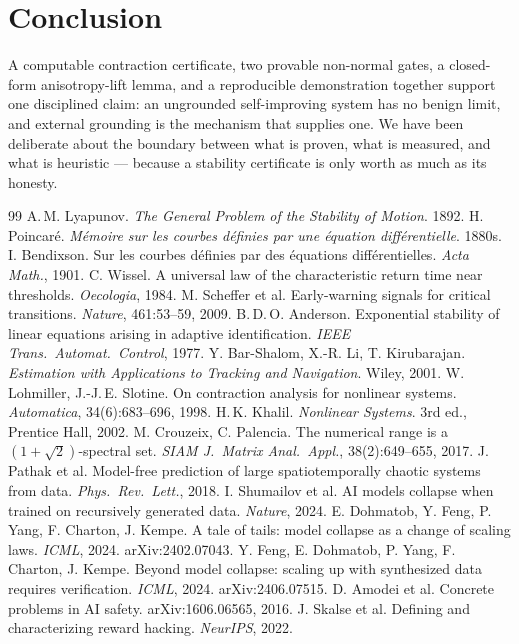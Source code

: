 \documentclass[11pt]{article}
\theoremstyle{definition}
\begin{document}
\section{Conclusion}
A computable contraction certificate, two provable non-normal gates, a closed-form
anisotropy-lift lemma, and a reproducible demonstration together support one disciplined
claim: an ungrounded self-improving system has no benign limit, and external grounding is
the mechanism that supplies one. We have been deliberate about the boundary between what is
proven, what is measured, and what is heuristic --- because a stability certificate is only
worth as much as its honesty.

\begin{thebibliography}{99}
 A.\,M. Lyapunov.
  \emph{The General Problem of the Stability of Motion}. 1892.
 H. Poincar\'e.
  \emph{M\'emoire sur les courbes d\'efinies par une \'equation diff\'erentielle}. 1880s.
 I. Bendixson.
  Sur les courbes d\'efinies par des \'equations diff\'erentielles. \emph{Acta Math.}, 1901.
 C. Wissel.
  A universal law of the characteristic return time near thresholds. \emph{Oecologia}, 1984.
 M. Scheffer et al.
  Early-warning signals for critical transitions. \emph{Nature}, 461:53--59, 2009.
 B.\,D.\,O. Anderson.
  Exponential stability of linear equations arising in adaptive identification.
  \emph{IEEE Trans.\ Automat.\ Control}, 1977.
 Y. Bar-Shalom, X.-R. Li, T. Kirubarajan.
  \emph{Estimation with Applications to Tracking and Navigation}. Wiley, 2001.
 W. Lohmiller, J.-J.\,E. Slotine.
  On contraction analysis for nonlinear systems. \emph{Automatica}, 34(6):683--696, 1998.
 H.\,K. Khalil.
  \emph{Nonlinear Systems}. 3rd ed., Prentice Hall, 2002.
 M. Crouzeix, C. Palencia.
  The numerical range is a $(1+\sqrt2)$-spectral set. \emph{SIAM J.\ Matrix Anal.\ Appl.},
  38(2):649--655, 2017.
 J. Pathak et al.
  Model-free prediction of large spatiotemporally chaotic systems from data.
  \emph{Phys.\ Rev.\ Lett.}, 2018.
 I. Shumailov et al.
  AI models collapse when trained on recursively generated data. \emph{Nature}, 2024.
 E. Dohmatob, Y. Feng, P. Yang, F. Charton, J. Kempe.
  A tale of tails: model collapse as a change of scaling laws. \emph{ICML}, 2024.
  arXiv:2402.07043.
 Y. Feng, E. Dohmatob, P. Yang, F. Charton, J. Kempe.
  Beyond model collapse: scaling up with synthesized data requires verification.
  \emph{ICML}, 2024. arXiv:2406.07515.
 D. Amodei et al.
  Concrete problems in AI safety. arXiv:1606.06565, 2016.
 J. Skalse et al.
  Defining and characterizing reward hacking. \emph{NeurIPS}, 2022.
\end{thebibliography}
\end{document}
